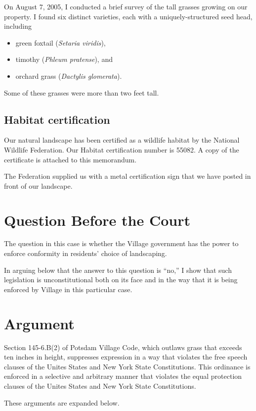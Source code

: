\documentclass[12pt]{article}
\begin{document}
On August 7, 2005, I conducted a brief survey of the tall grasses growing on our property.
I found six distinct varieties, each with a uniquely-structured seed head, including
\begin{itemize}
\item green foxtail ({\em Setaria viridis}),
\item timothy ({\em Phleum pratense}), and
\item orchard grass ({\em Dactylis glomerata}).
\end{itemize}
Some of these grasses were more than two feet tall.

\subsection{Habitat certification}

Our natural landscape has been certified as a wildlife habitat by the National Wildlife Federation.
Our Habitat certification number is 55082.
A copy of the certificate is attached to this memorandum. 

The Federation supplied us with a metal certification sign that we have posted in front of our landscape. 


\section{Question Before the Court}

The question in this case is whether the Village government has the power to enforce conformity in residents' choice of landscaping. 

In arguing below that the answer to this question is ``no,'' I show that such legislation is unconstitutional both on its face and in the way that it is being enforced by Village in this particular case.


\section{Argument}

Section 145-6.B(2) of Potsdam Village Code, which outlaws grass that exceeds ten inches in height, suppresses expression in a way that violates the free speech clauses of the Unites States and New York State Constitutions.
This ordinance is enforced in a selective and arbitrary manner that violates the equal protection clauses of the Unites States and New York State Constitutions.

These arguments are expanded below.
\end{document}
